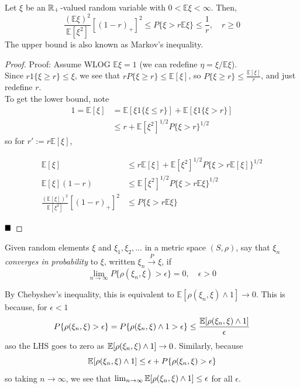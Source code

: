 \begin{theorem}
    Let $\xi$ be an $\mathbb{R}_{+}$-valued random variable with $0 < \mathbb{E}\xi < \infty$. Then,
    \[ \frac{(\mathbb{E}\xi)^2}{\mathbb{E}[\xi^2]}\left[(1 - r)_{+}\right]^2 \leq P\{\xi > r\mathbb{E}\xi\} \leq \frac{1}{r}, \quad r \geq 0 \]
    The upper bound is also known as Markov's inequality.
\end{theorem}
\begin{proof}{Proof:}
    Assume WLOG $\mathbb{E}\xi = 1$ (we can redefine $\eta = \xi/\mathbb{E}\xi$).\\

    Since $r1\{\xi \geq r\} \leq \xi$, we see that $rP\{\xi \geq r\} \leq \mathbb{E}[\xi]$, so $P\{\xi \geq r\} \leq \frac{\mathbb{E}[\xi]}{r}$, and just redefine $r$.\\

    To get the lower bound, note
    \begin{align*}
        1 = \mathbb{E}[\xi] &= \mathbb{E}[\xi 1\{\xi \leq r\}] + \mathbb{E}[\xi 1\{\xi > r\}]\\
        &\leq r + \mathbb{E}[\xi^2]^{1/2}P\{\xi > r\}^{1/2}
    \end{align*}
    so for $r' := r\mathbb{E}[\xi]$,

    \begin{align*}
        \mathbb{E}[\xi] &\leq r\mathbb{E}[\xi] + \mathbb{E}[\xi^2]^{1/2}P\{\xi > r\mathbb{E}[\xi]\}^{1/2}\\
        \mathbb{E}[\xi](1 - r) &\leq \mathbb{E}[\xi^2]^{1/2}P\{\xi > r\mathbb{E}\xi\}^{1/2}\\
        \frac{(\mathbb{E}[\xi])^2}{\mathbb{E}[\xi^2]}\left[(1 - r)_{+}\right]^2 &\leq P\{\xi > r\mathbb{E}\xi\}
    \end{align*}

    $\qed$
\end{proof}

\begin{definition}
    Given random elements $\xi$ and $\xi_1, \xi_2, \ldots$ in a metric space $(S, \rho)$, say that $\xi_n$ \emph{converges in probability} to $\xi$, written $\xi_n \xrightarrow{P} \xi$, if
    \[ \lim_{n \to \infty} P\{\rho(\xi_n, \xi) > \epsilon\} = 0, \quad \epsilon > 0 \]
\end{definition}
By Chebyshev's inequality, this is equivalent to $\mathbb{E}[\rho(\xi_n, \xi) \wedge 1] \to 0$. This is because, for $\epsilon < 1$
\[ P\{\rho(\xi_{n}, \xi) > \epsilon\} = P\{\rho(\xi_n, \xi) \wedge 1 > \epsilon\} \leq \frac{\mathbb{E}[\rho(\xi_{n}, \xi) \wedge 1]}{\epsilon} \]
aso the LHS goes to zero as $\mathbb{E}[\rho(\xi_{n}, \xi) \wedge 1] \to 0$. Similarly, because
\[ \mathbb{E}[\rho(\xi_n, \xi) \wedge 1] \leq \epsilon + P\{\rho(\xi_n, \xi) > \epsilon\} \]
so taking $n \to \infty$, we see that $\lim_{n \to \infty} \mathbb{E}[\rho(\xi_n, \xi) \wedge 1] \leq \epsilon$ for all $\epsilon$.\\


